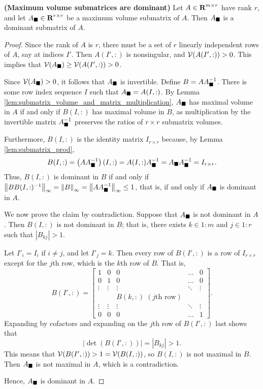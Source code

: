 \documentclass{article}
\begin{document}
	\begin{thm} \textnormal{\bf(Maximum volume submatrices are dominant)}
		\label{thm:maxvol_implies_dominant}
		Let $A \in \textnormal{\bf R}^{m\times r}$ have rank $r$, and let $A_\blacksquare \in \textnormal{\bf R}^{r\times r}$ be a maximum volume submatrix of $A$. Then $A_\blacksquare$ is a dominant submatrix of $A$.
		\begin{proof}
			Since the rank of $A$ is $r$, there must be a set of $r$ linearly independent rows of $A$, say at indices $I'$. Then $A(I',:)$ is nonsingular, and $\mathcal{V}(A(I',:)) > 0$. This implies that $\mathcal{V}(A_\blacksquare) \ge \mathcal{V}(A(I',:)) > 0$.
			
			Since $\mathcal{V}(A_\blacksquare) > 0$, it follows that $A_\blacksquare$ is invertible. Define $B = AA_\blacksquare^{-1}$. There is some row index sequence $I$ such that $A_\blacksquare = A(I,:)$. By Lemma \ref{lem:submatrix_volume_and_matrix_multiplication}, $A_\blacksquare$ has maximal volume in $A$ if and only if $B(I,:)$ has maximal volume in $B$, as multiplication by the invertible matrix $A_\blacksquare^{-1}$ preserves the ratios of $r\times r$ submatrix volumes.
			
			Furthermore, $B(I,:)$ is the identity matrix $I_{r\times r}$ because, by Lemma \ref{lem:submatrix_prod},
			\begin{equation}
				B(I,:) = \left(AA_\blacksquare^{-1}\right)(I,:) = A(I,:)A_\blacksquare^{-1} = A_\blacksquare A_\blacksquare^{-1} = I_{r\times r}.
			\end{equation}
			Thus, $B(I,:)$ is dominant in $B$ if and only if $\left\lVert BB(I,:)^{-1} \right\rVert_\infty = \left\lVert B \right\rVert_\infty = \left\lVert AA_\blacksquare^{-1} \right\rVert_\infty\le 1$, that is, if and only if $A_\blacksquare$ is dominant in $A$.
			
			We now prove the claim by contradiction. Suppose that $A_\blacksquare$ is not dominant in $A$. Then $B(I,:)$ is not dominant in $B$; that is, there exists $k \in 1:m$ and $j \in 1:r$ such that $|B_{kj}| > 1$. 
			
			Let $I'_i = I_i$ if $i \ne j$, and let $I'_j = k$. Then every row of $B(I',:)$ is a row of $I_{r\times r}$ except for the $j$th row, which is the $k$th row of $B$. That is,
			\begin{equation}
				B(I',:) = \left[\begin{matrix}
					1 & 0 & 0&\dots & 0 \\
					0 & 1 & 0 & \dots & 0 \\
					\vdots & \vdots &\vdots & \ddots & \vdots \\
					&  & B(k, :) \;(j\text{th row})& & \\
					\vdots & \vdots &\vdots & \ddots & \vdots \\
					0 & 0 & 0 & \dots & 1
				\end{matrix}\right].
			\end{equation}
			Expanding by cofactors and expanding on the $j$th row of $B(I',:)$ last shows that
			\begin{equation}
				|\det(B(I',:))| = |B_{kj}| > 1.
			\end{equation}
			This means that $\mathcal{V}(B(I',:)) > 1 = \mathcal{V}(B(I,:))$, so $B(I,:)$ is not maximal in $B$. Then $A_\blacksquare$ is not maximal in $A$, which is a contradiction.
			
			Hence, $A_\blacksquare$ is dominant in $A$.
		\end{proof}
	\end{thm}
	
\end{document}
